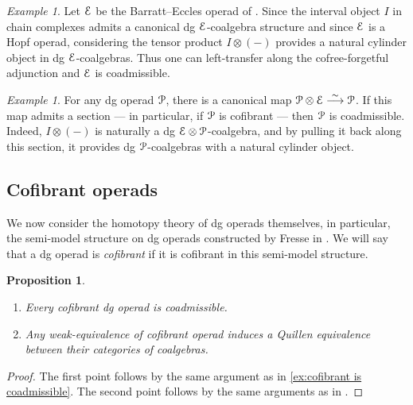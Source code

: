 \documentclass{proc-l}
\renewcommand{\mathcal}{\EuScript}
\newcommand{\oneop}{\mathcal{P}}
\theoremstyle{plain}
\newtheorem{proposition}[{theorem}]{Proposition}
\theoremstyle{definition}
\theoremstyle{remark}
\newtheorem{example}[{theorem}]{Example}
\begin{document}
\begin{example}%
\label{Example:2.13}Let $\mathcal{E}$ be the Barratt--Eccles operad of \cite{BergerFresse}. Since the interval object $I$ in chain complexes admits a canonical dg $\mathcal{E}$-coalgebra structure and since $\mathcal{E}$ is a Hopf operad, considering the tensor product $I \otimes (-)$ provides a natural cylinder object in dg $\mathcal{E}$-coalgebras. Thus one can left-transfer along the cofree-forgetful adjunction and $\mathcal{E}$ is coadmissible.
\end{example}

\begin{example}%
\label{Example:2.14}\label{ex:cofibrant is coadmissible}
For any dg operad $\oneop$, there is a canonical map $\oneop \otimes \mathcal{E} \stackrel\sim\longrightarrow \oneop$. If this map admits a section --- in particular, if $\oneop$ is cofibrant --- then $\oneop$ is coadmissible. Indeed, $I \otimes (-)$ is naturally a dg $\mathcal{E} \otimes \oneop$-coalgebra, and by pulling it back along this section, it provides dg $\oneop$-coalgebras with a natural cylinder object.
\end{example}

\subsection{Cofibrant operads}%
\label{Section:2.5}
We now consider the homotopy theory of dg operads themselves, in particular, the semi-model structure on dg operads constructed by Fresse in \cite[Chapter 12]{Fresse09}. We will say that a dg operad is \textit{cofibrant} if it is cofibrant in this semi-model structure.

\begin{proposition}%
\label{Proposition:2.15}\label{prop: cofibrant operads are coadmissible}\leavevmode
\begin{enumerate}
\item Every cofibrant dg operad is coadmissible.
\item Any weak-equivalence of cofibrant operad induces a Quillen equivalence between their categories of coalgebras.
\end{enumerate}
\end{proposition}

\begin{proof}
The first point follows by the same argument as in \cref{ex:cofibrant is coadmissible}. The second point follows by the same arguments as in \cite[Lemma 33 and Proposition 31]{premierpapier}.
\end{proof}
\end{document}
